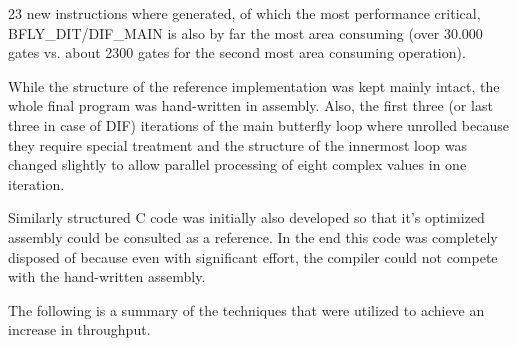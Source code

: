 \documentclass[ngerman, cd=lightcolor]{tudscrreprt}
\begin{document}
23 new instructions where generated, of which the most performance critical,
BFLY\_DIT/DIF\_MAIN is also by far the most area consuming (over 30.000 gates vs.
about 2300 gates for the second most area consuming operation).

While the structure of the reference implementation was kept mainly intact,
the whole final program was hand-written in assembly. Also, the first three (or
last three in case of DIF) iterations of the main butterfly loop where unrolled
because they require special treatment and the structure of the innermost
loop was changed slightly to allow parallel processing of eight complex values
in one iteration.

Similarly structured C code was initially also developed so that it’s optimized
assembly could be consulted as a reference. In the end this code was
completely disposed of because even with significant effort, the compiler
could not compete with the hand-written assembly.

The following is a summary of the techniques that were utilized to achieve an
increase in throughput.
\end{document}
